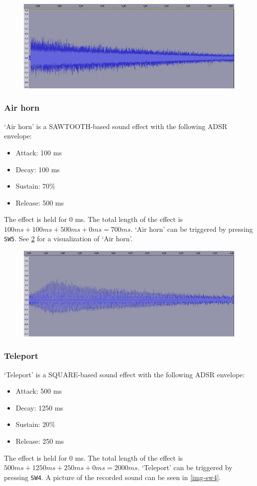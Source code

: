 \begin{figure}[H]
	\includegraphics[width = \textwidth]{images/SW6.png}
	\caption{}
	\label{img-sw6}
\end{figure}


\subsubsection{Air horn}
`Air horn' is a SAWTOOTH-based sound effect with the following ADSR envelope:
\begin{itemize}
	\item{Attack: 100 ms}
	\item{Decay: 100 ms}
	\item{Sustain: 70\%}
	\item{Release: 500 ms}
\end{itemize}
The effect is held for 0 ms.
The total length of the effect is $100 ms + 100 ms + 500 ms + 0 ms = 700 ms$.
`Air horn' can be triggered by pressing \texttt{SW5}.
See \ref{img-sw5} for a visualization of `Air horn'.

\begin{figure}[H]
	\includegraphics[width = \textwidth]{images/SW5.png}
	\caption{}
	\label{img-sw5}
\end{figure}

\subsubsection{Teleport}
`Teleport' is a SQUARE-based sound effect with the following ADSR envelope:
\begin{itemize}
	\item{Attack: 500 ms}
	\item{Decay: 1250 ms}
	\item{Sustain: 20\%}
	\item{Release: 250 ms}
\end{itemize}
The effect is held for 0 ms.
The total length of the effect is $500 ms + 1250 ms + 250 ms + 0 ms = 2000 ms$.
`Teleport' can be triggered by pressing \texttt{SW4}.
A picture of the recorded sound can be seen in \ref{img-sw4}.

